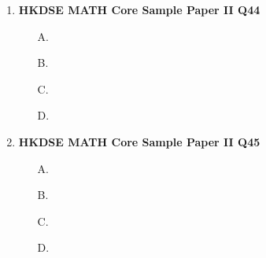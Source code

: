 \documentclass[12pt]{article}
\begin{document}
\begin{enumerate}
\begin{enumerate}
		\item[D.]
	\end{enumerate}
	\item \textbf{HKDSE MATH Core Sample Paper II Q44}\\
	\begin{enumerate}
		\item[A.]
		\item[B.]
		\item[C.]
		\item[D.]
	\end{enumerate}
	\item \textbf{HKDSE MATH Core Sample Paper II Q45}\\
	\begin{enumerate}
		\item[A.]
		\item[B.]
		\item[C.]
		\item[D.]
	\end{enumerate}

\end{enumerate}
\end{document}
